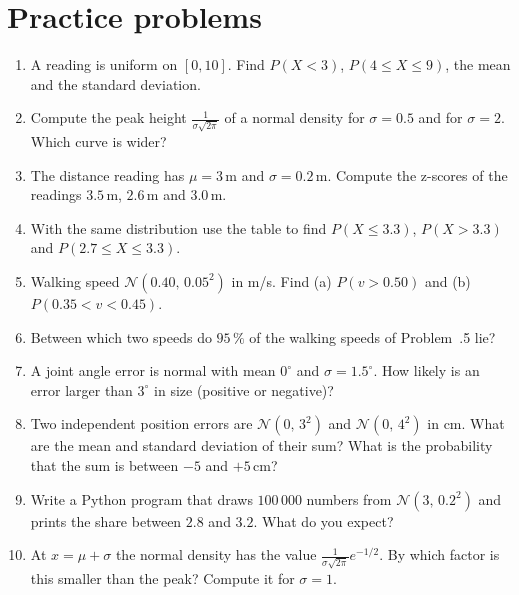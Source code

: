 \section*{Practice problems}
\begin{enumerate}[label=\textbf{\thechapter.\arabic*}]
  \item A reading is uniform on $[0,10]$. Find $P(X<3)$, $P(4\le X\le9)$, the mean and the standard deviation.
  \item Compute the peak height $\frac{1}{\sigma\sqrt{2\pi}}$ of a normal density for $\sigma=0.5$ and for $\sigma=2$. Which curve is wider?
  \item The distance reading has $\mu=3$\,m and $\sigma=0.2$\,m. Compute the z-scores of the readings $3.5$\,m, $2.6$\,m and $3.0$\,m.
  \item With the same distribution use the table to find $P(X\le3.3)$, $P(X>3.3)$ and $P(2.7\le X\le3.3)$.
  \item Walking speed $\mathcal N(0.40,\,0.05^2)$ in m/s. Find (a) $P(v>0.50)$ and (b) $P(0.35<v<0.45)$.
  \item Between which two speeds do $95\,\%$ of the walking speeds of Problem~\thechapter.5 lie?
  \item A joint angle error is normal with mean $0^\circ$ and $\sigma=1.5^\circ$. How likely is an error larger than $3^\circ$ in size (positive or negative)?
  \item Two independent position errors are $\mathcal N(0,\,3^2)$ and $\mathcal N(0,\,4^2)$ in cm. What are the mean and standard deviation of their sum? What is the probability that the sum is between $-5$ and $+5$\,cm?
  \item Write a Python program that draws $100\,000$ numbers from $\mathcal N(3,\,0.2^2)$ and prints the share between $2.8$ and $3.2$. What do you expect?
  \item[\textbf{\thechapter.10}$\star$] At $x=\mu+\sigma$ the normal density has the value $\frac{1}{\sigma\sqrt{2\pi}}e^{-1/2}$. By which factor is this smaller than the peak? Compute it for $\sigma=1$.
\end{enumerate}
